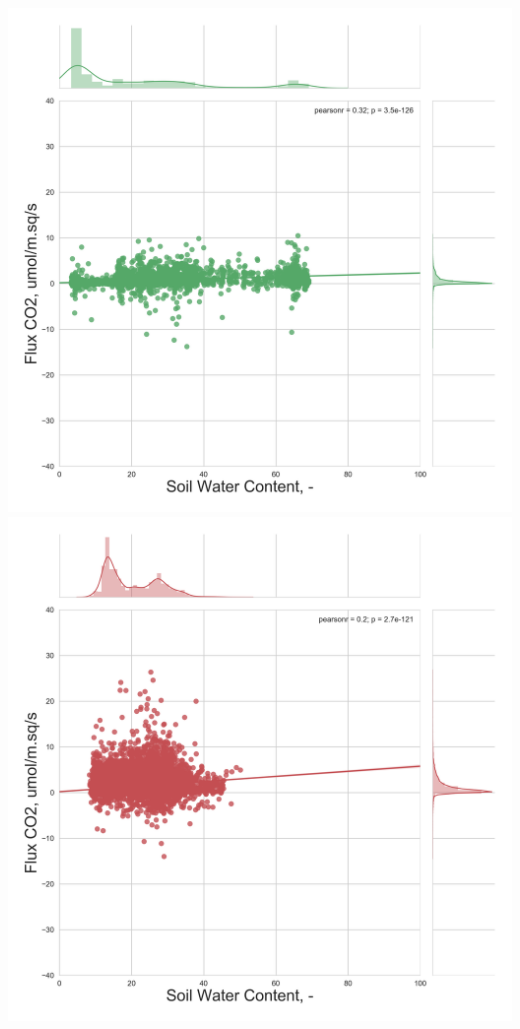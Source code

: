 \documentclass{beamer}
\begin{document}
\begin{frame}
\begin{columns}[t]
\centering
\includegraphics[width=\textwidth]{FvsSWC_night/CA-NS6.png}\\
\includegraphics[width=\textwidth]{FvsSWC_night/CA-Oas.png}

\end{columns}
\end{frame}
\end{document}

